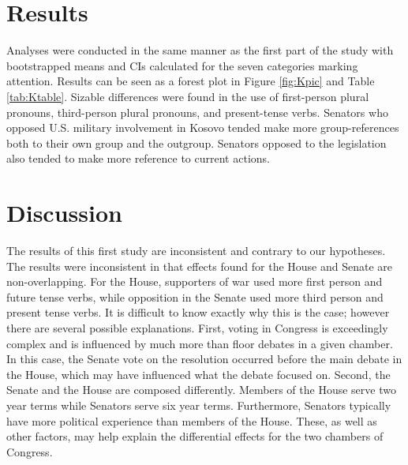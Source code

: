 \documentclass[english,man]{apa6}
\theoremstyle{definition}
\theoremstyle{definition}
\theoremstyle{definition}
\theoremstyle{remark}
\begin{document}
\section{Results}\label{results-1}

Analyses were conducted in the same manner as the first part of the
study with bootstrapped means and CIs calculated for the seven
categories marking attention. Results can be seen as a forest plot in
Figure \ref{fig:Kpic} and Table \ref{tab:Ktable}. Sizable differences
were found in the use of first-person plural pronouns, third-person
plural pronouns, and present-tense verbs. Senators who opposed U.S.
military involvement in Kosovo tended make more group-references both to
their own group and the outgroup. Senators opposed to the legislation
also tended to make more reference to current actions.

\section{Discussion}\label{discussion}

The results of this first study are inconsistent and contrary to our
hypotheses. The results were inconsistent in that effects found for the
House and Senate are non-overlapping. For the House, supporters of war
used more first person and future tense verbs, while opposition in the
Senate used more third person and present tense verbs. It is difficult
to know exactly why this is the case; however there are several possible
explanations. First, voting in Congress is exceedingly complex and is
influenced by much more than floor debates in a given chamber. In this
case, the Senate vote on the resolution occurred before the main debate
in the House, which may have influenced what the debate focused on.
Second, the Senate and the House are composed differently. Members of
the House serve two year terms while Senators serve six year terms.
Furthermore, Senators typically have more political experience than
members of the House. These, as well as other factors, may help explain
the differential effects for the two chambers of Congress.
\end{document}
